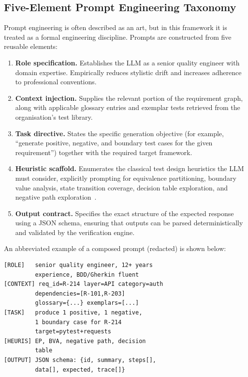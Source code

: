 \documentclass[11pt,letterpaper]{article}
\begin{document}
\subsection{Five-Element Prompt Engineering Taxonomy}

Prompt engineering is often described as an art, but in this framework it is treated as a formal engineering discipline. Prompts are constructed from five reusable elements:

\begin{enumerate}
\item \textbf{Role specification.} Establishes the LLM as a senior quality engineer with domain expertise. Empirically reduces stylistic drift and increases adherence to professional conventions.
\item \textbf{Context injection.} Supplies the relevant portion of the requirement graph, along with applicable glossary entries and exemplar tests retrieved from the organisation's test library.
\item \textbf{Task directive.} States the specific generation objective (for example, ``generate positive, negative, and boundary test cases for the given requirement'') together with the required target framework.
\item \textbf{Heuristic scaffold.} Enumerates the classical test design heuristics the LLM must consider, explicitly prompting for equivalence partitioning, boundary value analysis, state transition coverage, decision table exploration, and negative path exploration~\cite{beizer1990,myers2011}.
\item \textbf{Output contract.} Specifies the exact structure of the expected response using a JSON schema, ensuring that outputs can be parsed deterministically and validated by the verification engine.
\end{enumerate}

An abbreviated example of a composed prompt (redacted) is shown below:

\begin{lstlisting}
[ROLE]   senior quality engineer, 12+ years
         experience, BDD/Gherkin fluent
[CONTEXT] req_id=R-214 layer=API category=auth
         dependencies=[R-101,R-203]
         glossary={...} exemplars=[...]
[TASK]   produce 1 positive, 1 negative,
         1 boundary case for R-214
         target=pytest+requests
[HEURIS] EP, BVA, negative path, decision
         table
[OUTPUT] JSON schema: {id, summary, steps[],
         data[], expected, trace[]}
\end{lstlisting}
\end{document}
